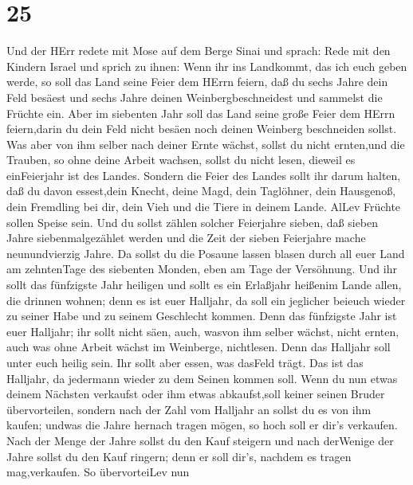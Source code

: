 \hypertarget{section-24}{%
\section{25}\label{section-24}}

 Und der HErr redete mit Mose auf dem Berge Sinai und
sprach:  Rede mit den Kindern Israel und sprich zu ihnen:
Wenn ihr ins Landkommt, das ich euch geben werde, so soll das Land seine
Feier dem HErrn feiern,  daß du sechs Jahre dein Feld
besäest und sechs Jahre deinen Weinbergbeschneidest und sammelst die
Früchte ein.  Aber im siebenten Jahr soll das Land seine
große Feier dem HErrn feiern,darin du dein Feld nicht besäen noch deinen
Weinberg beschneiden sollst.  Was aber von ihm selber nach
deiner Ernte wächst, sollst du nicht ernten,und die Trauben, so ohne
deine Arbeit wachsen, sollst du nicht lesen, dieweil es einFeierjahr ist
des Landes.  Sondern die Feier des Landes sollt ihr darum
halten, daß du davon essest,dein Knecht, deine Magd, dein Taglöhner,
dein Hausgenoß, dein Fremdling bei dir,  dein Vieh und die
Tiere in deinem Lande. AlLev Früchte sollen Speise sein. 
Und du sollst zählen solcher Feierjahre sieben, daß sieben Jahre
siebenmalgezählet werden und die Zeit der sieben Feierjahre mache
neunundvierzig Jahre.  Da sollst du die Posaune lassen
blasen durch all euer Land am zehntenTage des siebenten Monden, eben am
Tage der Versöhnung.  Und ihr sollt das fünfzigste Jahr
heiligen und sollt es ein Erlaßjahr heißenim Lande allen, die drinnen
wohnen; denn es ist euer Halljahr, da soll ein jeglicher beieuch wieder
zu seiner Habe und zu seinem Geschlecht kommen.  Denn das
fünfzigste Jahr ist euer Halljahr; ihr sollt nicht säen, auch, wasvon
ihm selber wächst, nicht ernten, auch was ohne Arbeit wächst im
Weinberge, nichtlesen.  Denn das Halljahr soll unter euch
heilig sein. Ihr sollt aber essen, was dasFeld trägt.  Das
ist das Halljahr, da jedermann wieder zu dem Seinen kommen soll.
 Wenn du nun etwas deinem Nächsten verkaufst oder ihm etwas
abkaufst,soll keiner seinen Bruder übervorteilen,  sondern
nach der Zahl vom Halljahr an sollst du es von ihm kaufen; undwas die
Jahre hernach tragen mögen, so hoch soll er dir's verkaufen.
 Nach der Menge der Jahre sollst du den Kauf steigern und
nach derWenige der Jahre sollst du den Kauf ringern; denn er soll dir's,
nachdem es tragen mag,verkaufen.  So übervorteiLev nun

